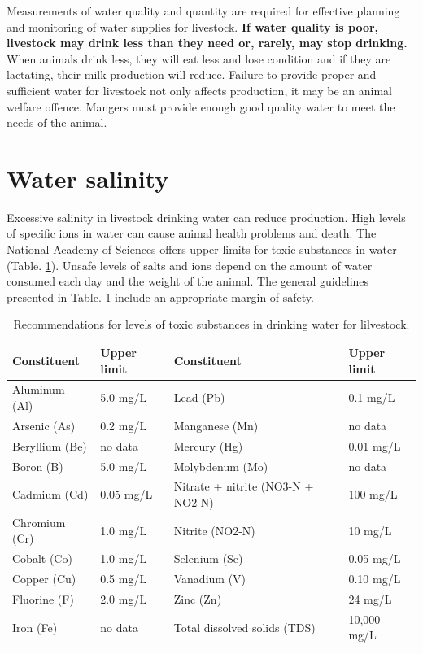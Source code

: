 \documentclass[]{book}
\begin{document}
Measurements of water quality and quantity are required for effective planning and monitoring of water supplies for livestock. \textbf{If water quality is poor, livestock may drink less than they need or, rarely, may stop drinking.} When animals drink less, they will eat less and lose condition and if they are lactating, their milk production will reduce. Failure to provide proper and sufficient water for livestock not only affects production, it may be an animal welfare offence. Mangers must provide enough good quality water to meet the needs of the animal.

\hypertarget{water-salinity}{%
\section{Water salinity}\label{water-salinity}}

Excessive salinity in livestock drinking water can reduce production. High levels of specific ions in water can cause animal health problems and death. The National Academy of Sciences offers upper limits for toxic substances in water (Table. \ref{tab:water-toxic}). Unsafe levels of salts and ions depend on the amount of water consumed each day and the weight of the animal. The general guidelines presented in Table. \ref{tab:water-toxic} include an appropriate margin of safety.

\begin{table}

\caption{\label{tab:water-toxic}Recommendations for levels of toxic substances in drinking water for lilvestock. }
\centering
\begin{tabular}[t]{llll}
\toprule
Constituent & Upper limit & Constituent & Upper limit\\
\midrule
Aluminum (Al) & 5.0 mg/L & Lead (Pb) & 0.1 mg/L\\
Arsenic (As) & 0.2 mg/L & Manganese (Mn) & no data\\
Beryllium (Be) & no data & Mercury (Hg) & 0.01 mg/L\\
Boron (B) & 5.0 mg/L & Molybdenum (Mo) & no data\\
Cadmium (Cd) & 0.05 mg/L & Nitrate + nitrite (NO3-N + NO2-N) & 100 mg/L\\
\addlinespace
Chromium (Cr) & 1.0 mg/L & Nitrite (NO2-N) & 10 mg/L\\
Cobalt (Co) & 1.0 mg/L & Selenium (Se) & 0.05 mg/L\\
Copper (Cu) & 0.5 mg/L & Vanadium (V) & 0.10 mg/L\\
Fluorine (F) & 2.0 mg/L & Zinc (Zn) & 24 mg/L\\
Iron (Fe) & no data & Total dissolved solids (TDS) & 10,000 mg/L\\
\bottomrule
\end{tabular}
\end{table}
\end{document}
